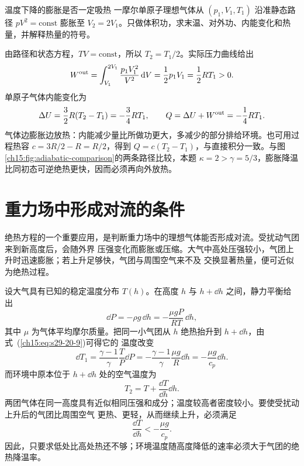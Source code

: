 {\Needspace{180pt}
\begin{origexamplebox}{温度下降的膨胀是否一定吸热}\label{ch15:ex:teaching-polytropic}
一摩尔单原子理想气体从 $(p_1,V_1,T_1)$ 沿准静态路径 $pV^2=\mathrm{const}$ 膨胀至 $V_2=2V_1$。只做体积功，求末温、对外功、内能变化和热量，并解释热量的符号。

\ThQPolytropic
\end{origexamplebox}
\Needspace{65pt}
\begin{xesolution}
\ThAPolytropic

由路径和状态方程，$TV=\mathrm{const}$，所以 $T_2=T_1/2$。实际压力曲线给出
\[
 W^{\rm out}=\int_{V_1}^{2V_1}\frac{p_1V_1^2}{V^2}\mathop{}\!\mathrm d V
 =\frac12p_1V_1=\frac12RT_1>0.
\]
单原子气体内能变化为
\[
 \Delta U=\frac32R(T_2-T_1)=-\frac34RT_1,
 \qquad Q=\Delta U+W^{\rm out}=-\frac14RT_1.
\]
气体边膨胀边放热：内能减少量比所做功更大，多减少的部分排给环境。也可用过程热容 $c=3R/2-R=R/2$，得到 $Q=c(T_2-T_1)$，与直接积分一致。与图\ref{ch15:fig:adiabatic-comparison}的两条路径比较，本题 $\kappa=2>\gamma=5/3$，膨胀降温比同初态可逆绝热更快，因而必须再向外放热。
\end{xesolution}

\section{重力场中形成对流的条件}

绝热方程的一个重要应用，是判断重力场中的理想气体能否形成对流。受扰动气团来到新高度后，会随外界
压强变化而膨胀或压缩。大气中高处压强较小，气团上升时迅速膨胀；若上升足够快，气团与周围空气来不及
交换显著热量，便可近似为绝热过程。

设大气具有已知的稳定温度分布 $T(h)$。在高度 $h$ 与 $h+\dd h$ 之间，静力平衡给出
\begin{equation*}
  \dd P=-\rho g\,\dd h=-\frac{\mu gP}{RT}\,\dd h,
\end{equation*}
其中 $\mu$ 为气体平均摩尔质量。把同一小气团从 $h$ 绝热抬升到 $h+\dd h$，由式~(\ref{ch15:eq:s29-20-9})可得它的
温度改变
\begin{equation*}
  \dd T_1=\frac{\gamma-1}{\gamma}\frac{T}{P}\dd P
  =-\frac{\gamma-1}{\gamma}\frac{\mu g}{R}\dd h
  =-\frac{\mu g}{c_p}\dd h.
\end{equation*}
而环境中原本位于 $h+\dd h$ 处的空气温度为
\begin{equation*}
  T_2=T+\frac{\dd T}{\dd h}\dd h.
\end{equation*}
两团气体在同一高度具有近似相同压强和成分；温度较高者密度较小。要使受扰动上升后的气团比周围空气
更热、更轻，从而继续上升，必须满足
\begin{equation}
  \boxed{\frac{\dd T}{\dd h}<-\frac{\mu g}{c_p}}. \label{ch15:eq:s29-20-11}
\end{equation}
因此，只要求低处比高处热还不够；环境温度随高度降低的速率必须大于气团的绝热降温率。

}
